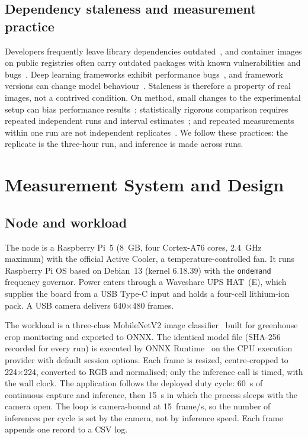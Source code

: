 \documentclass[10pt,journal,compsoc]{IEEEtran}
\begin{document}
\subsection{Dependency staleness and measurement practice}
Developers frequently leave library dependencies outdated~\cite{kula2018developers}, and container images on public registries often carry outdated packages with known vulnerabilities and bugs~\cite{zerouali2019relation,shu2017study}. Deep learning frameworks exhibit performance bugs~\cite{makkouk2022empirical}, and framework versions can change model behaviour~\cite{shahriari2022how}. Staleness is therefore a property of real images, not a contrived condition. On method, small changes to the experimental setup can bias performance results~\cite{mytkowicz2009producing}; statistically rigorous comparison requires repeated independent runs and interval estimates~\cite{georges2007statistically,kalibera2013rigorous,hoefler2015scientific}; and repeated measurements within one run are not independent replicates~\cite{hurlbert1984pseudoreplication}. We follow these practices: the replicate is the three-hour run, and inference is made across runs.

\section{Measurement System and Design}\label{sec:method}

\subsection{Node and workload}
The node is a Raspberry Pi~5 (8~GB, four Cortex-A76 cores, 2.4~GHz maximum) with the official Active Cooler, a temperature-controlled fan. It runs Raspberry Pi OS based on Debian~13 (kernel 6.18.39) with the \texttt{ondemand} frequency governor. Power enters through a Waveshare UPS HAT~(E), which supplies the board from a USB Type-C input and holds a four-cell lithium-ion pack. A USB camera delivers 640$\times$480 frames.

The workload is a three-class MobileNetV2 image classifier~\cite{sandler2018mobilenetv2} built for greenhouse crop monitoring and exported to ONNX. The identical model file (SHA-256 recorded for every run) is executed by ONNX Runtime~\cite{onnxruntime} on the CPU execution provider with default session options. Each frame is resized, centre-cropped to 224$\times$224, converted to RGB and normalised; only the inference call is timed, with the wall clock. The application follows the deployed duty cycle: 60~s of continuous capture and inference, then 15~s in which the process sleeps with the camera open. The loop is camera-bound at 15~frame/s, so the number of inferences per cycle is set by the camera, not by inference speed. Each frame appends one record to a CSV log.
\end{document}

